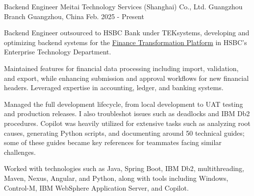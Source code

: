 
\begin{cventries}

  \cventry
    {Backend Engineer} %
    {Meitai Technology Services (Shanghai) Co., Ltd. Guangzhou Branch} %
    {Guangzhou, China} %
    {Feb. 2025 - Present} %
    {
      \begin{cvitems} %
        \item {Backend Engineer outsourced to HSBC Bank under TEKsystems, developing and optimizing backend systems for the \href{https://www.google.com/search?q=Finance+Transformation+Platform+HSBC}{Finance Transformation Platform} in HSBC’s Enterprise Technology Department.}
        \item {Maintained features for financial data processing including import, validation, and export, while enhancing submission and approval workflows for new financial headers. Leveraged expertise in accounting, ledger, and banking systems.}
        \item {Managed the full development lifecycle, from local development to UAT testing and production releases. I also troubleshot issues such as deadlocks and IBM Db2 procedures. Copilot was heavily utilized for extensive tasks such as analyzing root causes, generating Python scripts, and documenting around 50 technical guides; some of these guides became key references for teammates facing similar challenges.}
        \item {Worked with technologies such as Java, Spring Boot, IBM Db2, multithreading, Maven, Nexus, Angular, and Python, along with tools including Windows, Control-M, IBM WebSphere Application Server, and Copilot.}
      \end{cvitems}
    }


\end{cventries}
